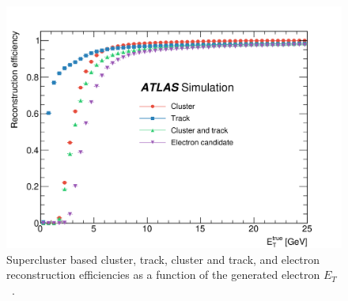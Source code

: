 \begin{figure}[]
    \centering
    \includegraphics[width=\mediumfigwidth]{images/supercluster_reco.png}
    \caption[Supercluster based cluster, track, cluster and track, and electron reconstruction efficiencies as a function of the generated electron $E_T$ ]{Supercluster based cluster, track, cluster and track, and electron reconstruction efficiencies as a function of the generated electron $E_T$~\cite{Aad:2019tso}.}
    \label{fig:method:screco}
\end{figure}

